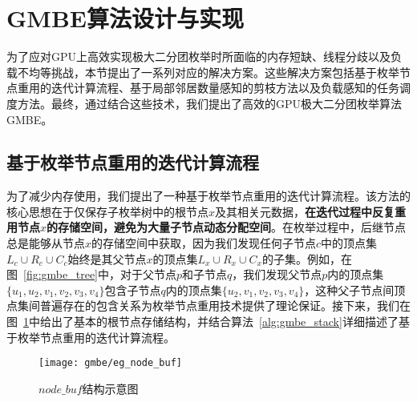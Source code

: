 

\section{GMBE算法设计与实现}
为了应对GPU上高效实现极大二分团枚举时所面临的内存短缺、线程分歧以及负载不均等挑战，本节提出了一系列对应的解决方案。这些解决方案包括基于枚举节点重用的迭代计算流程、基于局部邻居数量感知的剪枝方法以及负载感知的任务调度方法。最终，通过结合这些技术，我们提出了高效的GPU极大二分团枚举算法 GMBE。


\subsection{基于枚举节点重用的迭代计算流程}
\label{subsec:gmbe_memory}


为了减少内存使用，我们提出了一种基于枚举节点重用的迭代计算流程。该方法的核心思想在于仅保存子枚举树中的根节点$x$及其相关元数据，\textbf{在迭代过程中反复重用节点$x$的存储空间，避免为大量子节点动态分配空间}。在枚举过程中，后继节点总是能够从节点$x$的存储空间中获取，因为我们发现任何子节点$c$中的顶点集$L_c \cup R_c \cup C_c$始终是其父节点$x$的顶点集$L_x\cup R_x\cup C_x$的子集。例如，在图~\ref{fig:gmbe_tree}中，对于父节点$p$和子节点$q$，我们发现父节点$p$内的顶点集$\{u_1, u_2, v_1, v_2, v_3, v_4\}$包含子节点$q$内的顶点集$\{u_2, v_1, v_2, v_3, v_4\}$，这种父子节点间顶点集间普遍存在的包含关系为枚举节点重用技术提供了理论保证。接下来，我们在图~\ref{fig:gmbe_node_buf}中给出了基本的根节点存储结构，并结合算法~\ref{alg:gmbe_stack}详细描述了基于枚举节点重用的迭代计算流程。




\begin{figure} [H]
  \center
    \texttt{[image: gmbe/eg\_node\_buf]}
  \caption{$node\_buf$结构示意图}
  \label{fig:gmbe_node_buf}
\end{figure}


